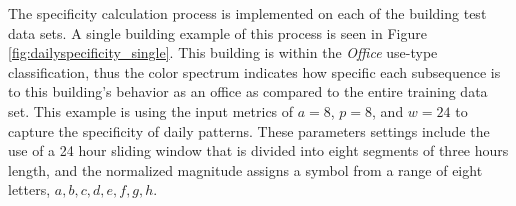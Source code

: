 The specificity calculation process is implemented on each of the building test data sets. A single building example of this process is seen in Figure \ref{fig:dailyspecificity_single}. This building is within the \emph{Office} use-type classification, thus the color spectrum indicates how specific each subsequence is to this building's behavior as an office as compared to the entire training data set. This example is using the input metrics of $a=8$, $p=8$, and $w=24$ to capture the specificity of daily patterns. These parameters settings include the use of a 24 hour sliding window that is divided into eight segments of three hours length, and the normalized magnitude assigns a symbol from a range of eight letters, $a,b,c,d,e,f,g,h$.